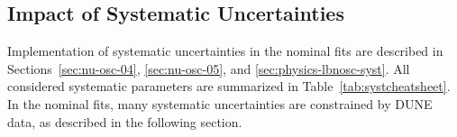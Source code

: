 \subsection{Impact of Systematic Uncertainties}
\label{sec:physics-lbnosc-systresults}

Implementation of systematic uncertainties in the nominal fits are described in Sections~\ref{sec:nu-osc-04}, \ref{sec:nu-osc-05}, and \ref{sec:physics-lbnosc-syst}. All considered systematic parameters are summarized in Table~\ref{tab:systcheatsheet}. %
In the nominal fits, many systematic uncertainties are constrained by DUNE data, as described in the following section.

